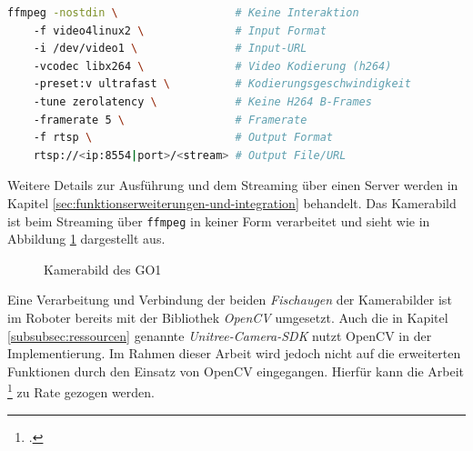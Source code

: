 \begin{lstlisting}[language=Bash]
ffmpeg -nostdin \                  # Keine Interaktion
    -f video4linux2 \              # Input Format
    -i /dev/video1 \               # Input-URL
    -vcodec libx264 \              # Video Kodierung (h264)
    -preset:v ultrafast \          # Kodierungsgeschwindigkeit
    -tune zerolatency \            # Keine H264 B-Frames
    -framerate 5 \                 # Framerate
    -f rtsp \                      # Output Format
    rtsp://<ip:8554|port>/<stream> # Output File/URL
\end{lstlisting}

\noindent Weitere Details zur Ausführung und dem Streaming über einen Server werden in Kapitel \ref{sec:funktionserweiterungen-und-integration}
behandelt.
Das Kamerabild ist beim Streaming über \texttt{ffmpeg} in keiner Form verarbeitet und sieht wie in Abbildung \ref{fig:kamera-bild}
dargestellt aus.

\begin{figure}[h]
    \caption{Kamerabild des GO1}\label{fig:kamera-bild}
\end{figure}

Eine Verarbeitung und Verbindung der beiden \emph{Fischaugen} der Kamerabilder ist im Roboter bereits mit der Bibliothek \emph{OpenCV}
umgesetzt.
Auch die in Kapitel \ref{subsubsec:ressourcen} genannte \emph{Unitree-Camera-SDK} nutzt OpenCV in der Implementierung.
Im Rahmen dieser Arbeit wird jedoch nicht auf die erweiterten Funktionen durch den Einsatz von OpenCV eingegangen.
Hierfür kann die Arbeit \footcite{jonas} zu Rate gezogen werden.